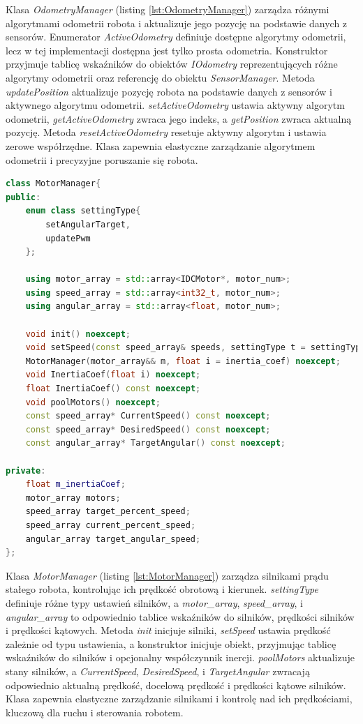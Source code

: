 \documentclass[12pt,twoside]{article}
\begin{document}
Klasa \textit{OdometryManager} (listing \ref{lst:OdometryManager}) zarządza różnymi algorytmami odometrii robota i aktualizuje jego pozycję na podstawie danych z sensorów. Enumerator \textit{ActiveOdometry} definiuje dostępne algorytmy odometrii, lecz w tej implementacji dostępna jest tylko prosta odometria. Konstruktor przyjmuje tablicę wskaźników do obiektów \textit{IOdometry} reprezentujących różne algorytmy odometrii oraz referencję do obiektu \textit{SensorManager}. Metoda \textit{updatePosition} aktualizuje pozycję robota na podstawie danych z sensorów i aktywnego algorytmu odometrii. \textit{setActiveOdometry} ustawia aktywny algorytm odometrii, \textit{getActiveOdometry} zwraca jego indeks, a \textit{getPosition} zwraca aktualną pozycję. Metoda \textit{resetActiveOdometry} resetuje aktywny algorytm i ustawia zerowe współrzędne. Klasa zapewnia elastyczne zarządzanie algorytmem odometrii i precyzyjne poruszanie się robota.


\begin{lstlisting}[language=C++, caption={Klasa MotorManager}, label={lst:MotorManager}]
class MotorManager{
public:
    enum class settingType{
        setAngularTarget,
        updatePwm
    };

    using motor_array = std::array<IDCMotor*, motor_num>;
    using speed_array = std::array<int32_t, motor_num>; 
    using angular_array = std::array<float, motor_num>;

    void init() noexcept;
    void setSpeed(const speed_array& speeds, settingType t = settingType::updatePwm) noexcept;
    MotorManager(motor_array&& m, float i = inertia_coef) noexcept;
    void InertiaCoef(float i) noexcept;
    float InertiaCoef() const noexcept;
    void poolMotors() noexcept;
    const speed_array* CurrentSpeed() const noexcept;
    const speed_array* DesiredSpeed() const noexcept;
    const angular_array* TargetAngular() const noexcept;

private:
    float m_inertiaCoef;
    motor_array motors;
    speed_array target_percent_speed;
    speed_array current_percent_speed;
    angular_array target_angular_speed;
};
\end{lstlisting}

Klasa \textit{MotorManager} (listing \ref{lst:MotorManager}) zarządza silnikami prądu stałego robota, kontrolując ich prędkość obrotową i kierunek. \textit{settingType} definiuje różne typy ustawień silników, a \textit{motor\_array}, \textit{speed\_array}, i \textit{angular\_array} to odpowiednio tablice wskaźników do silników, prędkości silników i prędkości kątowych. Metoda \textit{init} inicjuje silniki, \textit{setSpeed} ustawia prędkość zależnie od typu ustawienia, a konstruktor inicjuje obiekt, przyjmując tablicę wskaźników do silników i opcjonalny współczynnik inercji. \textit{poolMotors} aktualizuje stany silników, a \textit{CurrentSpeed}, \textit{DesiredSpeed}, i \textit{TargetAngular} zwracają odpowiednio aktualną prędkość, docelową prędkość i prędkości kątowe silników. Klasa zapewnia elastyczne zarządzanie silnikami i kontrolę nad ich prędkościami, kluczową dla ruchu i sterowania robotem.
\end{document}
